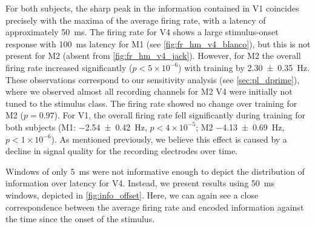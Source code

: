 For both subjects, the sharp peak in the information contained in \ac{V1} coincides precisely with the maxima of the average firing rate, with a latency of approximately \SI{50}{\milli\second}.
The firing rate for \ac{V4} shows a large stimulus-onset response with \SI{100}{\milli\second} latency for \ac{M1} (see \autoref{fig:fr_hm_v4_blanco}), but this is not present for \ac{M2} (absent from \autoref{fig:fr_hm_v4_jack}).
However, for \ac{M2} the overall firing rate increased significantly ($p < 5 \times 10^{-6}$) with training by \SI{2.30\pm0.35}{Hz}.
These observations correspond to our sensitivity analysis (see \autoref{sec:pl_dprime}), where we observed almost all recording channels for \ac{M2} \ac{V4} were initially not tuned to the stimulus class.
The firing rate showed no change over training for \ac{M2} ($p=0.97$).
For \ac{V1}, the overall firing rate fell significantly during training for both subjects (\ac{M1}: \SI{-2.54\pm0.42}{Hz}, $p < 4 \times 10^{-5}$; \ac{M2} \SI{-4.13\pm0.69}{Hz}, $p < 1 \times 10^{-6}$).
As mentioned previously, we believe this effect is caused by a decline in signal quality for the recording electrodes over time.

Windows of only \SI{5}{\milli\second} were not informative enough to depict the distribution of information over latency for \ac{V4}.
Instead, we present results using \SI{50}{\milli\second} windows, depicted in \autoref{fig:info_offset}.
Here, we can again see a close correspondence between the average firing rate and encoded information against the time since the onset of the stimulus.

